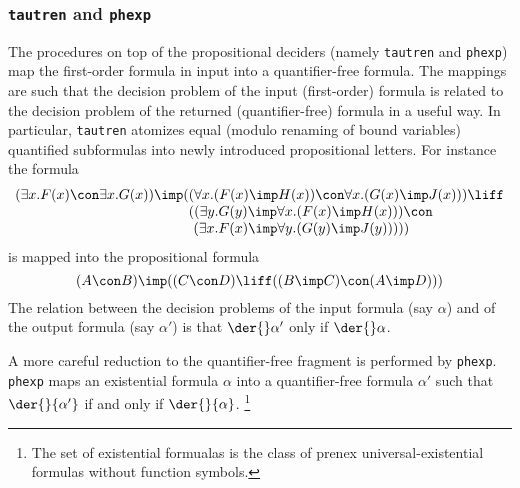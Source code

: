 \subsubsection*{{\tt tautren} and {\tt phexp}}
The procedures on top of the propositional deciders (namely {\tt tautren}
and {\tt phexp}) map the first-order formula in input into a quantifier-free
formula.
The mappings are such that the decision problem of the input (first-order)
formula is related to the decision problem of the returned (quantifier-free)
formula in a useful way.
In particular, {\tt tautren} atomizes equal (modulo renaming of bound
variables) quantified subformulas into newly introduced propositional
letters.
For instance the formula
\begin{equation}\label{pb29-reduced}
\setlength{\arraycolsep}{0cm}
\begin{array}{rl}
(\exists x.F(x) \con \exists x.G(x)) \imp (&( \forall x.(F(x) \imp H(x)) \con \forall x.(G(x) \imp J(x))) \liff \\
& ((\exists y.G(y) \imp \forall x.(F(x) \imp H(x))) \con\\
&\ (\exists x.F(x) \imp \forall y.(G(y) \imp J(y)))))
\end{array}
\end{equation}
is mapped into the propositional formula
\begin{equation}\label{pb29-prop}
(A \con B) \imp ((C \con D) \liff ((B \imp C) \con (A \imp D)))
\end{equation}
The relation between the decision problems of the input formula (say $\alpha$)
and of the output formula (say $\alpha'$) is that
$\der{}\alpha'$ only if $\der{}\alpha$.

A more careful reduction to the quantifier-free fragment is performed by
{\tt phexp}.
{\tt phexp} maps an existential formula $\alpha$ into a quantifier-free formula
$\alpha'$ such that $\der{}{\alpha'}$ if and only if $\der{}{\alpha}$.%
\footnote{The set of existential formualas is the class of prenex
universal-existential formulas without function symbols.}

